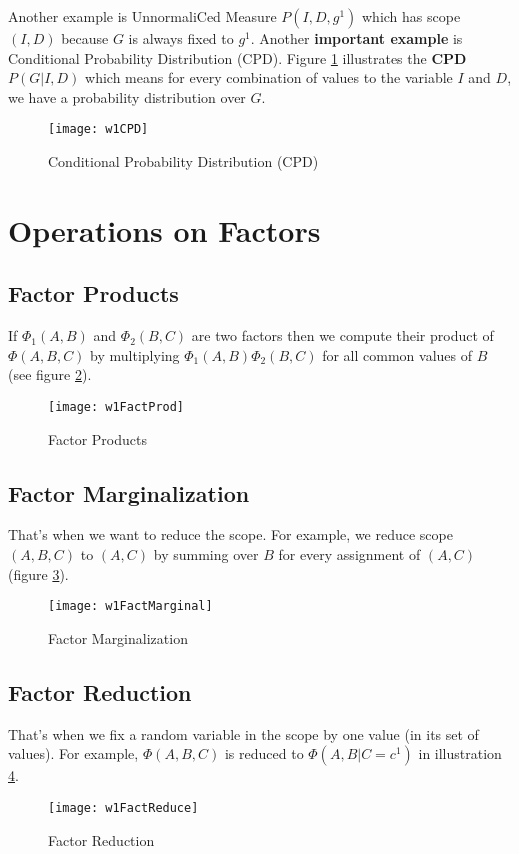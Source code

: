 Another example is UnnormaliCed Measure $P(I,D,g^1)$ which has scope $(I,D)$ because $G$ is always fixed to $g^1$. Another \textbf{important example} is Conditional Probability Distribution (CPD). Figure \ref{w1CPD} illustrates the \textbf{CPD} $P(G | I, D)$ which means for every combination of values to the variable $I$ and $D$, we have a probability distribution over $G$.  

\begin{figure}[!ht]
\centering
\texttt{[image: w1CPD]}
\caption{Conditional Probability Distribution (CPD)}
\label{w1CPD}
\end{figure}

\section{Operations on Factors}
\subsection{Factor Products}
If $\Phi_1(A,B)$ and $\Phi_2(B,C)$ are two factors then we compute their product of $\Phi(A,B,C)$ by multiplying $\Phi_1(A,B)\Phi_2(B,C)$ for all common values of $B$ (see figure \ref{w1FactProd}).

\begin{figure}[!ht]
\centering
\texttt{[image: w1FactProd]}
\caption{Factor Products}
\label{w1FactProd}
\end{figure}

\subsection{Factor Marginalization}
That's when we want to reduce the scope. For example, we reduce scope $(A,B,C)$ to $(A,C)$ by summing over $B$ for every assignment of $(A,C)$ (figure \ref{w1FactMarginal}).

\begin{figure}[!ht]
\centering
\texttt{[image: w1FactMarginal]}
\caption{Factor Marginalization}
\label{w1FactMarginal}
\end{figure}

\subsection{Factor Reduction}
That's when we fix a random variable in the scope by one value (in its set of values). For example, $\Phi(A,B,C)$ is reduced to $\Phi(A,B | C = c^1)$ in illustration \ref{w1FactReduce}.
\begin{figure}[!ht]
\centering
\texttt{[image: w1FactReduce]}
\caption{Factor Reduction}
\label{w1FactReduce}
\end{figure}
